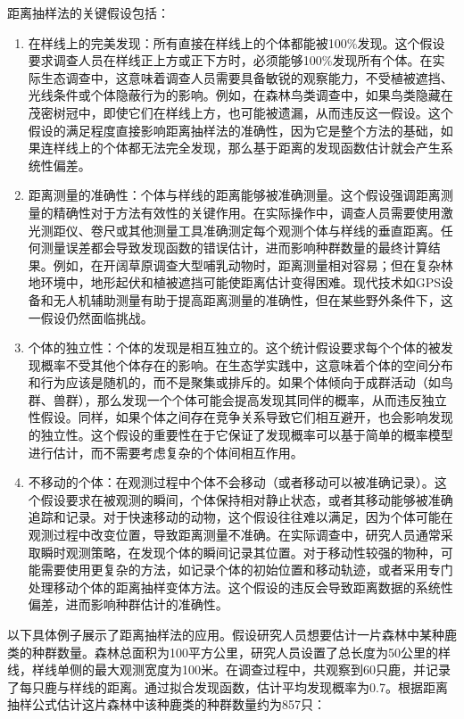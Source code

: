 \documentclass[
  twoside,12pt,fontset=none]{ctexbook}
\begin{document}
距离抽样法的关键假设包括：

\begin{enumerate}
\def\labelenumi{\arabic{enumi}.}
\item
  在样线上的完美发现：所有直接在样线上的个体都能被100\%发现。这个假设要求调查人员在样线正上方或正下方时，必须能够100\%发现所有个体。在实际生态调查中，这意味着调查人员需要具备敏锐的观察能力，不受植被遮挡、光线条件或个体隐蔽行为的影响。例如，在森林鸟类调查中，如果鸟类隐藏在茂密树冠中，即使它们在样线上方，也可能被遗漏，从而违反这一假设。这个假设的满足程度直接影响距离抽样法的准确性，因为它是整个方法的基础，如果连样线上的个体都无法完全发现，那么基于距离的发现函数估计就会产生系统性偏差。
\item
  距离测量的准确性：个体与样线的距离能够被准确测量。这个假设强调距离测量的精确性对于方法有效性的关键作用。在实际操作中，调查人员需要使用激光测距仪、卷尺或其他测量工具准确测定每个观测个体与样线的垂直距离。任何测量误差都会导致发现函数的错误估计，进而影响种群数量的最终计算结果。例如，在开阔草原调查大型哺乳动物时，距离测量相对容易；但在复杂林地环境中，地形起伏和植被遮挡可能使距离估计变得困难。现代技术如GPS设备和无人机辅助测量有助于提高距离测量的准确性，但在某些野外条件下，这一假设仍然面临挑战。
\item
  个体的独立性：个体的发现是相互独立的。这个统计假设要求每个个体的被发现概率不受其他个体存在的影响。在生态学实践中，这意味着个体的空间分布和行为应该是随机的，而不是聚集或排斥的。如果个体倾向于成群活动（如鸟群、兽群），那么发现一个个体可能会提高发现其同伴的概率，从而违反独立性假设。同样，如果个体之间存在竞争关系导致它们相互避开，也会影响发现的独立性。这个假设的重要性在于它保证了发现概率可以基于简单的概率模型进行估计，而不需要考虑复杂的个体间相互作用。
\item
  不移动的个体：在观测过程中个体不会移动（或者移动可以被准确记录）。这个假设要求在被观测的瞬间，个体保持相对静止状态，或者其移动能够被准确追踪和记录。对于快速移动的动物，这个假设往往难以满足，因为个体可能在观测过程中改变位置，导致距离测量不准确。在实际调查中，研究人员通常采取瞬时观测策略，在发现个体的瞬间记录其位置。对于移动性较强的物种，可能需要使用更复杂的方法，如记录个体的初始位置和移动轨迹，或者采用专门处理移动个体的距离抽样变体方法。这个假设的违反会导致距离数据的系统性偏差，进而影响种群估计的准确性。
\end{enumerate}

以下具体例子展示了距离抽样法的应用。假设研究人员想要估计一片森林中某种鹿类的种群数量。森林总面积为100平方公里，研究人员设置了总长度为50公里的样线，样线单侧的最大观测宽度为100米。在调查过程中，共观察到60只鹿，并记录了每只鹿与样线的距离。通过拟合发现函数，估计平均发现概率为0.7。根据距离抽样公式估计这片森林中该种鹿类的种群数量约为857只：
\end{document}
